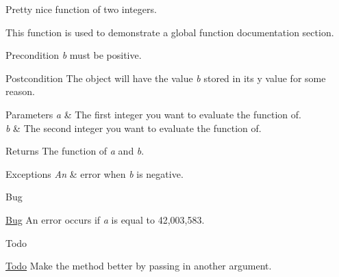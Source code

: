 Pretty nice function of two integers. 

This function is used to demonstrate a global function documentation section. \begin{DoxyPrecond}{Precondition}
{\itshape b} must be positive. 
\end{DoxyPrecond}
\begin{DoxyPostcond}{Postcondition}
The object will have the value {\itshape b} stored in its y value for some reason. 
\end{DoxyPostcond}

\begin{DoxyParams}{Parameters}
{\em a} & The first integer you want to evaluate the function of. \\
\hline
{\em b} & The second integer you want to evaluate the function of. \\
\hline
\end{DoxyParams}
\begin{DoxyReturn}{Returns}
The function of {\itshape a} and {\itshape b}. 
\end{DoxyReturn}

\begin{DoxyExceptions}{Exceptions}
{\em An} & error when {\itshape b} is negative. \\
\hline
\end{DoxyExceptions}
\begin{DoxyRefDesc}{Bug}
\item[\hyperlink{bug__bug000003}{Bug}]An error occurs if {\itshape a} is equal to 42,003,583. \end{DoxyRefDesc}
\begin{DoxyRefDesc}{Todo}
\item[\hyperlink{todo__todo000004}{Todo}]Make the method better by passing in another argument. \end{DoxyRefDesc}
